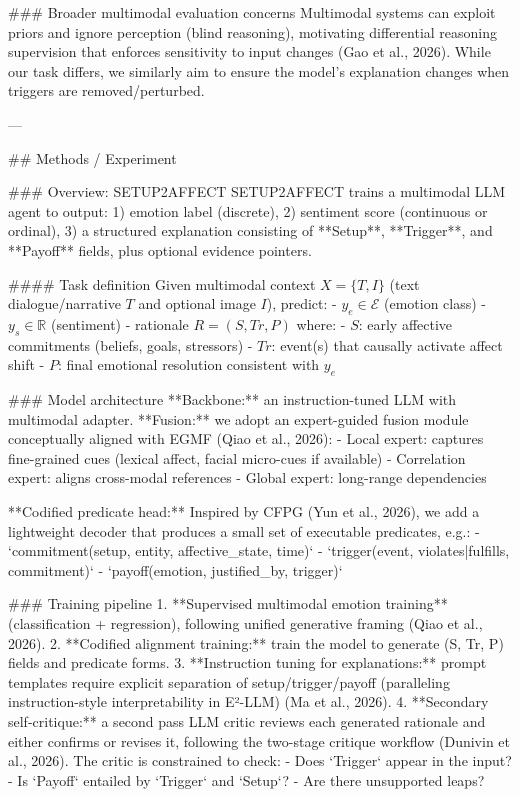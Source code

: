 ### Broader multimodal evaluation concerns  
Multimodal systems can exploit priors and ignore perception (blind reasoning), motivating differential reasoning supervision that enforces sensitivity to input changes (Gao et al., 2026). While our task differs, we similarly aim to ensure the model’s explanation changes when triggers are removed/perturbed.

---

## Methods / Experiment  

### Overview: SETUP2AFFECT  
SETUP2AFFECT trains a multimodal LLM agent to output:  
1) emotion label (discrete),  
2) sentiment score (continuous or ordinal),  
3) a structured explanation consisting of **Setup**, **Trigger**, and **Payoff** fields, plus optional evidence pointers.

#### Task definition  
Given multimodal context \(X = \{T, I\}\) (text dialogue/narrative \(T\) and optional image \(I\)), predict:
- \(y_e \in \mathcal{E}\) (emotion class)
- \(y_s \in \mathbb{R}\) (sentiment)
- rationale \(R = (S, Tr, P)\) where:
  - \(S\): early affective commitments (beliefs, goals, stressors)
  - \(Tr\): event(s) that causally activate affect shift
  - \(P\): final emotional resolution consistent with \(y_e\)

### Model architecture  
**Backbone:** an instruction-tuned LLM with multimodal adapter.  
**Fusion:** we adopt an expert-guided fusion module conceptually aligned with EGMF (Qiao et al., 2026):  
- Local expert: captures fine-grained cues (lexical affect, facial micro-cues if available)  
- Correlation expert: aligns cross-modal references  
- Global expert: long-range dependencies

**Codified predicate head:** Inspired by CFPG (Yun et al., 2026), we add a lightweight decoder that produces a small set of executable predicates, e.g.:  
- `commitment(setup, entity, affective_state, time)`  
- `trigger(event, violates|fulfills, commitment)`  
- `payoff(emotion, justified_by, trigger)`  

### Training pipeline  
1. **Supervised multimodal emotion training** (classification + regression), following unified generative framing (Qiao et al., 2026).  
2. **Codified alignment training:** train the model to generate (S, Tr, P) fields and predicate forms.  
3. **Instruction tuning for explanations:** prompt templates require explicit separation of setup/trigger/payoff (paralleling instruction-style interpretability in E²-LLM) (Ma et al., 2026).  
4. **Secondary self-critique:** a second pass LLM critic reviews each generated rationale and either confirms or revises it, following the two-stage critique workflow (Dunivin et al., 2026). The critic is constrained to check:  
   - Does `Trigger` appear in the input?  
   - Is `Payoff` entailed by `Trigger` and `Setup`?  
   - Are there unsupported leaps?

